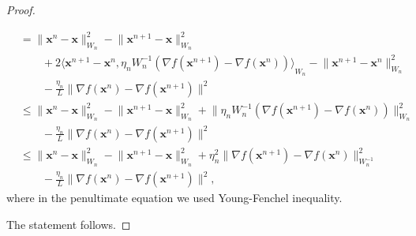 \documentclass[11pt]{article}
\theoremstyle{plain}
\theoremstyle{definition}
\theoremstyle{remark}
\newcommand{\norm}[1]{\lVert{#1}\rVert}
\newcommand{\scalarp}[1]{\langle{#1}\rangle}
\newcommand{\pair}[2]{{\langle{{#1},{#2}}\rangle}}
\newcommand{\HH}{X}
\newcommand{\x}{x}
\newcommand{\bx}{\bm{x}}
\newcommand{\w}{w}
\newcommand{\iter}{n}
\newcommand{\W}{W}
\begin{document}
\begin{proof}
\begin{enumerate}[label={\rm (\roman*)}]
\begin{align*}
& =\norm{\bx^{\iter}-\bx}_{\W_\iter}^2 - \norm{\bx^{\iter+1}-\bx}_{\W_\iter}^2\\
&\qquad + 2\pair{\bx^{\iter+1}-\bx^{\iter}}{\eta_\iter\W_\iter^{-1}(\nabla f(\bx^{\iter+1})-\nabla f(\bx^{\iter}))}_{\W_\iter} - \norm{\bx^{\iter+1}-\bx^{\iter}}_{\W_\iter}^2\\
&\qquad
- \frac{\eta_\iter}{L} \norm{\nabla f(\bx^{\iter})-\nabla f(\bx^{\iter+1})}^2\\[1ex]
&\leq \norm{\bx^{\iter}-\bx}_{\W_\iter}^2 - \norm{\bx^{\iter+1}-\bx}_{\W_\iter}^2 +  \norm{\eta_\iter\W_\iter^{-1}(\nabla f(\bx^{\iter+1})-\nabla f(\bx^{\iter}))}_{\W_\iter}^2\\[1ex]
&\qquad- \frac{\eta_\iter}{L} \norm{\nabla f(\bx^{\iter})-\nabla f(\bx^{\iter+1})}^2\\[1ex]
&\leq \norm{\bx^{\iter}-\bx}_{\W_\iter}^2 - \norm{\bx^{\iter+1}-\bx}_{\W_\iter}^2 +  \eta_\iter^2\norm{\nabla f(\bx^{\iter+1})-\nabla f(\bx^{\iter})}_{\W_\iter^{-1}}^2
\\
& \qquad -\frac{\eta_\iter}{L} \norm{\nabla f(\bx^{\iter})-\nabla f(\bx^{\iter+1})}^2,
\end{align*}
where in the penultimate equation we used Young-Fenchel inequality.
\end{enumerate}
The statement follows.
\end{proof}
\end{document}

